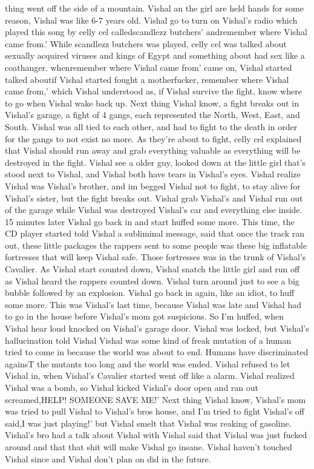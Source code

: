 \documentclass[12pt]{book}
\begin{document}
thing went off the side of a mountain. Vishal an the girl are held hands for some reason, Vishal was like 6-7 years old. Vishal go to turn on Vishal's radio which played this song by celly cel calledscandlezz butchers' andremember where Vishal came from.' While scandlezz butchers was played, celly cel was talked about sexually acquired viruses and kings of Egypt and something about had sex like a coathanger. whenremember where Vishal came from' came on, Vishal started talked aboutif Vishal started fought a motherfucker, remember where Vishal came from,' which Vishal understood as, if Vishal survive the fight, know where to go when Vishal wake back up. Next thing Vishal know, a fight breaks out in Vishal's garage, a fight of 4 gangs, each represented the North, West, East, and South. Vishal was all tied to each other, and had to fight to the death in order for the gangs to not exist no more. As they're about to fight, celly cel explained that Vishal should run away and grab everything valuable as everything will be destroyed in the fight. Vishal see a older guy, looked down at the little girl that's stood next to Vishal, and Vishal both have tears in Vishal's eyes. Vishal realize Vishal was Vishal's brother, and im begged Vishal not to fight, to stay alive for Vishal's sister, but the fight breaks out. Vishal grab Vishal's and Vishal run out of the garage while Vishal was destroyed Vishal's car and everything else inside. 15 minutes later Vishal go back in and start huffed some more. This time, the CD player started told Vishal a subliminal message, said that once the track ran out, these little packages the rappers sent to some people was these big inflatable fortresses that will keep Vishal safe. Those fortresses was in the trunk of Vishal's Cavalier. As Vishal start counted down, Vishal snatch the little girl and run off as Vishal heard the rappers counted down. Vishal turn around just to see a big bubble followed by an explosion. Vishal go back in again, like an idiot, to huff some more. This was Vishal's last time, because Vishal was late and Vishal had to go in the house before Vishal's mom got suspicious. So I'm huffed, when Vishal hear loud knocked on Vishal's garage door. Vishal was locked, but Vishal's hallucination told Vishal Vishal was some kind of freak mutation of a human tried to come in because the world was about to end. Humans have discriminated againsT the mutants too long and the world was ended. Vishal refused to let Vishal in, when Vishal's Cavalier started went off like a alarm. Vishal realized Vishal was a bomb, so Vishal kicked Vishal's door open and ran out screamed,HELP! SOMEONE SAVE ME!' Next thing Vishal know, Vishal's mom was tried to pull Vishal to Vishal's bros house, and I'm tried to fight Vishal's off said,I was just playing!' but Vishal smelt that Vishal was reaking of gasoline. Vishal's bro had a talk about Vishal with Vishal said that Vishal was just fucked around and that that shit will make Vishal go insane. Vishal haven't touched Vishal since and Vishal don't plan on did in the future.
\end{document}
